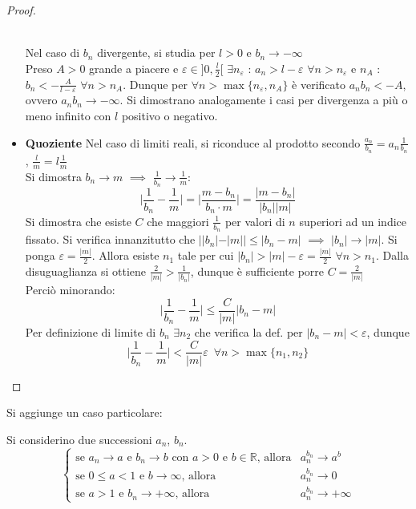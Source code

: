 \documentclass[10pt]{article}
\theoremstyle{plain}
\begin{document}
\begin{proof}
\begin{itemize}
    \\Nel caso di $b_n$ divergente, si studia per $l>0$ e $b_n \rightarrow -\infty$
    \\Preso $A>0$ grande a piacere e $\varepsilon \in ]0, \frac{l}{2}[$ $\exists n_\varepsilon$ : $a_n > l - \varepsilon$ $\forall n > n_\varepsilon$ e $n_A$ : $b_n < - \frac{A}{l - \varepsilon}$ $\forall n > n_A$.
    Dunque per $\forall n > \max \{n_\varepsilon, n_A\}$ è verificato $a_n b_n < -A$, ovvero $a_n b_n \rightarrow - \infty$. Si dimostrano analogamente i casi per divergenza a più o meno infinito con $l$ positivo o negativo.
    \item \textbf{Quoziente} Nel caso di limiti reali, si riconduce al prodotto secondo $\frac{a_n}{b_n} = a_n \frac{1}{b_n}$, $\frac{l}{m} = l \frac{1}{m}$
    \\Si dimostra $b_n \rightarrow m$ $\implies$ $\frac{1}{b_n} \rightarrow \frac{1}{m}$: 
    \[\bigg| \frac{1}{b_n} - \frac{1}{m}\bigg| = \bigg| \frac{m - b_n}{b_n \cdot m} \bigg| = \frac{|m - b_n|}{|b_n||m|}\]
    Si dimostra che esiste $C$ che maggiori $\frac{1}{b_n}$ per valori di $n$ superiori ad un indice fissato. Si verifica innanzitutto che $||b_n| - |m|| \leq |b_n - m|$ $\implies$ $|b_n| \rightarrow |m|$. Si ponga $\varepsilon = \frac{|m|}{2}$. Allora esiste $n_1$ tale per cui $|b_n| > |m| - \varepsilon = \frac{|m|}{2}$ $\forall n > n_1$. Dalla disuguaglianza si ottiene $\frac{2}{|m|} > \frac{1}{|b_n|}$, dunque è sufficiente porre $C = \frac{2}{|m|}$
    \\Perciò minorando:
    \[\bigg| \frac{1}{b_n} - \frac{1}{m}\bigg| \leq \frac{C}{|m|} |b_n - m|\]
    Per definizione di limite di $b_n$ $\exists n_2$ che verifica la def. per $|b_n - m| < \varepsilon$, dunque 
    \[\bigg| \frac{1}{b_n} - \frac{1}{m}\bigg| < \frac{C}{|m|}\varepsilon \enspace \forall n > \max \{n_1, n_2\}\]
    \end{itemize}
\end{proof}

Si aggiunge un caso particolare:
\begin{prop}
    Si considerino due successioni $a_n$, $b_n$.
        \[\begin{cases} \textrm{se $a_n \rightarrow a$ e $b_n \rightarrow b$ con $a > 0$ e $b \in \mathbb{R}$, allora} & 
        a_n^{b_n} \rightarrow a^b\\
        \textrm{se $0 \leq a < 1$ e $b \rightarrow \infty$, allora}
        & a_n^{b_n} \rightarrow 0\\
        \textrm{se $a > 1$ e $b_n \rightarrow + \infty$, allora}
        & a_n^{b_n} \rightarrow + \infty
    \end{cases}\]
\end{prop}
\end{document}
